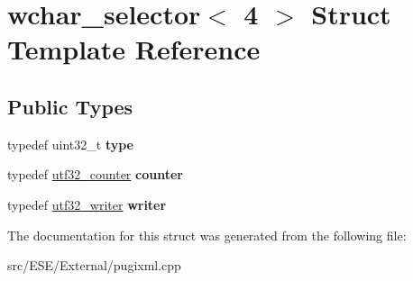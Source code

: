 \hypertarget{structwchar__selector_3_014_01_4}{\section{wchar\-\_\-selector$<$ 4 $>$ Struct Template Reference}
\label{structwchar__selector_3_014_01_4}
}
\subsection*{Public Types}
\begin{DoxyCompactItemize}
\item 
\hypertarget{structwchar__selector_3_014_01_4_af45ac603ab6fefec66e5c29044b4eed6}{typedef uint32\-\_\-t {\bfseries type}}\label{structwchar__selector_3_014_01_4_af45ac603ab6fefec66e5c29044b4eed6}

\item 
\hypertarget{structwchar__selector_3_014_01_4_a7d7c585ae0819660112b8c8683971b97}{typedef \hyperlink{structutf32__counter}{utf32\-\_\-counter} {\bfseries counter}}\label{structwchar__selector_3_014_01_4_a7d7c585ae0819660112b8c8683971b97}

\item 
\hypertarget{structwchar__selector_3_014_01_4_a48042e7fe51c4661397ae7afe3905243}{typedef \hyperlink{structutf32__writer}{utf32\-\_\-writer} {\bfseries writer}}\label{structwchar__selector_3_014_01_4_a48042e7fe51c4661397ae7afe3905243}

\end{DoxyCompactItemize}


The documentation for this struct was generated from the following file\-:\begin{DoxyCompactItemize}
\item 
src/\-E\-S\-E/\-External/pugixml.\-cpp\end{DoxyCompactItemize}
